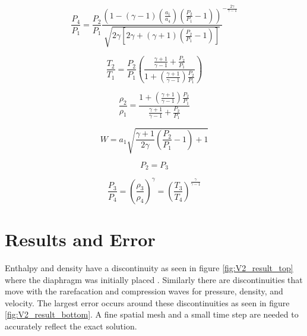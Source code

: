     \begin{equation}
    \label{eq:ref1_7.94}
    	\frac{P_{4}}{P_{1}} = \frac{P_{2}}{P_{1}} \frac{
    	\left( 1 - (\gamma-1)(\frac{a_{1}}{a_{4}})(\frac{P_{2}}{P_{1}} -1) \right) }
    	{\sqrt{2 \gamma \left[ 2 \gamma + (\gamma +1)(\frac{P_{2}}{P_{1}} -1)\right]}}^{
    	- \frac{2 \gamma}{\gamma - 1}}
    \end{equation}
    
    \begin{equation}
    	\frac{T_{2}}{T_{1}} = \frac{P_{2}}{P_{1}} \left(
    	\frac{\frac{\gamma + 1}{\gamma - 1} + \frac{P_{2}}{P_{1}}}
    	{1 + (\frac{\gamma +1}{\gamma - 1}) \frac{P_{2}}{P_{1}}} \right)
    \end{equation}
    
    \begin{equation}
    	\frac{\rho_{2}}{\rho_{1}} =
    	\frac{1 + (\frac{\gamma + 1}{\gamma - 1}) \frac{P_{2}}{P_{1}}}
    	{\frac{\gamma + 1}{\gamma - 1} + \frac{P_{2}}{P_{1}}} 
    \end{equation}
    
    \begin{equation}
    	W = a_{1} \sqrt{ \frac{\gamma + 1}{2 \gamma} 
    	                 \left( \frac{P_{2}}{P_{1}} -1 \right) +1 }
    \end{equation}
    
    \begin{equation}
    	P_{2} = P_{3}
    \end{equation}
    
    \begin{equation}
    	\frac{P_{3}}{P_{4}} = 
    	\left( \frac{\rho_{3}}{\rho_{4}} \right)^{\gamma} =
    	\left( \frac{T_{3}}{T_{4}} \right)^{\frac{\gamma}{\gamma -1}}
    \end{equation}
    
    \section{Results and Error}
    
    Enthalpy and density have a discontinuity as seen in figure
    \ref{fig:V2_result_top} where the diaphragm was initially placed . Similarly
    there are discontinuities that move with the rarefacation and compression
    waves for pressure, density, and velocity. The largest error occurs around
    these discontinuities as seen in figure \ref{fig:V2_result_bottom}. A 
    fine spatial mesh and a small time step are needed to accurately reflect the
    exact solution.
    
